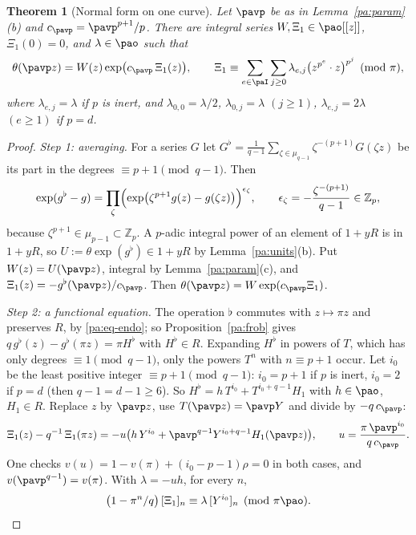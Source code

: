 \documentclass[10pt]{amsart}
\newtheorem{theorem}{Theorem}[section]
\theoremstyle{definition}
\theoremstyle{remark}
\newcommand{\Z}{\mathbb Z}
\begin{document}
\begin{theorem}[Normal form on one curve]\label{pa:onecurve}
Let $\pavp$ be as in Lemma~\ref{pa:param}(b) and $c_\pavp=\pavp^{p+1}/p$. There are integral series
$W,\Xi_1\in\pao[[z]]$, $\Xi_1(0)=0$, and $\lambda\in\pao$ such that
\[
\theta(\pavp z)=W(z)\exp\bigl(c_\pavp\,\Xi_1(z)\bigr),\qquad
\Xi_1\equiv\sum_{e\in\paI}\sum_{j\ge0}\lambda_{e,j}\bigl(z^{p^e}\cdot z\bigr)^{p^j}\pmod\pi ,
\]
where $\lambda_{e,j}=\lambda$ if $p$ is inert, and $\lambda_{0,0}=\lambda/2$,
$\lambda_{0,j}=\lambda$ $(j\ge1)$, $\lambda_{e,j}=2\lambda$ $(e\ge1)$ if $p=d$.
\end{theorem}
\begin{proof}
\emph{Step 1: averaging.} For a series $G$ let $G^\flat=\frac1{q-1}\sum_{\zeta\in\mu_{q-1}}
\zeta^{-(p+1)}G(\zeta z)$ be its part in the degrees $\equiv p+1\pmod{q-1}$. Then
\[
\exp(g^\flat-g)=\prod_{\zeta}\Bigl(\exp\bigl(\zeta^{p+1}g(z)-g(\zeta z)\bigr)\Bigr)^{\epsilon_\zeta},
\qquad\epsilon_\zeta=-\frac{\zeta^{-(p+1)}}{q-1}\in\Z_p ,
\]
because $\zeta^{p+1}\in\mu_{p-1}\subset\Z_p$. A $p$-adic integral power of an element of $1+yR$ is
in $1+yR$, so $U:=\theta\exp(g^\flat)\in1+yR$ by Lemma~\ref{pa:units}(b). Put $W(z)=U(\pavp z)$,
integral by Lemma~\ref{pa:param}(c), and $\Xi_1(z)=-g^\flat(\pavp z)/c_\pavp$. Then
$\theta(\pavp z)=W\exp(c_\pavp\Xi_1)$.

\emph{Step 2: a functional equation.} The operation $\flat$ commutes with $z\mapsto\pi z$ and
preserves $R$, by \eqref{pa:eq-endo}; so Proposition~\ref{pa:frob} gives
$q\,g^\flat(z)-g^\flat(\pi z)=\pi H^\flat$ with $H^\flat\in R$. Expanding $H^\flat$ in powers of
$T$, which has only degrees $\equiv1\pmod{q-1}$, only the powers $T^n$ with $n\equiv p+1$ occur.
Let $i_0$ be the least positive integer $\equiv p+1\pmod{q-1}$: $i_0=p+1$ if $p$ is inert, $i_0=2$
if $p=d$ (then $q-1=d-1\ge6$). So $H^\flat=h\,T^{i_0}+T^{i_0+q-1}H_1$ with $h\in\pao$, $H_1\in R$.
Replace $z$ by $\pavp z$, use $T(\pavp z)=\pavp Y$ and divide by $-q\,c_\pavp$:
\[
\Xi_1(z)-q^{-1}\,\Xi_1(\pi z)=-u\bigl(h\,Y^{i_0}+\pavp^{q-1}Y^{i_0+q-1}H_1(\pavp z)\bigr),\qquad
u=\frac{\pi\,\pavp^{i_0}}{q\,c_\pavp}.
\]
One checks $v(u)=1-v(\pi)+(i_0-p-1)\rho=0$ in both cases, and $v(\pavp^{q-1})=v(\pi)$. With
$\lambda=-uh$, for every $n$,
\begin{equation}\label{pa:eq-fe}
\bigl(1-\pi^n/q\bigr)\,[\Xi_1]_n\equiv\lambda\,[Y^{i_0}]_n\pmod{\pi\pao}.
\end{equation}


\end{proof}
\end{document}
